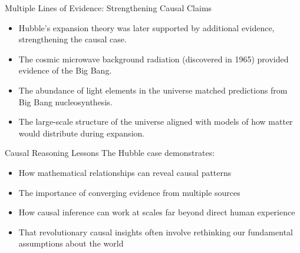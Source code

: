 \documentclass{beamer}
\begin{document}
\begin{frame}{Multiple Lines of Evidence: Strengthening Causal Claims}
    \begin{itemize}
        \item Hubble's expansion theory was later supported by additional evidence, strengthening the causal case.
        \item The cosmic microwave background radiation (discovered in 1965) provided evidence of the Big Bang.
        \item The abundance of light elements in the universe matched predictions from Big Bang nucleosynthesis.
        \item The large-scale structure of the universe aligned with models of how matter would distribute during expansion.
    \end{itemize}
    
    \begin{alertblock}{Causal Reasoning Lessons}
        \scriptsize
        The Hubble case demonstrates:
        \begin{itemize}
            \item How mathematical relationships can reveal causal patterns
            \item The importance of converging evidence from multiple sources
            \item How causal inference can work at scales far beyond direct human experience
            \item That revolutionary causal insights often involve rethinking our fundamental assumptions about the world
        \end{itemize}
    \end{alertblock}
\end{frame}
\end{document}
